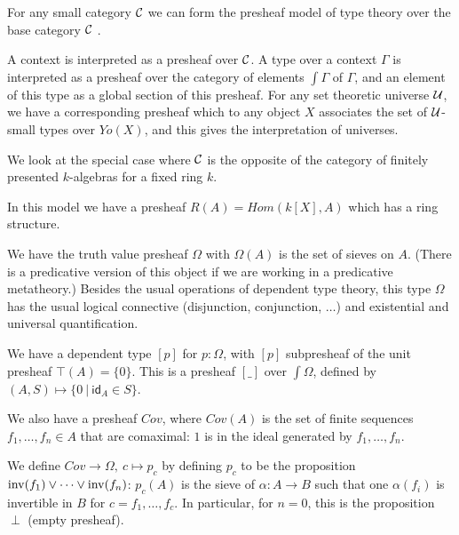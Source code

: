 For any small category $\mathcal{C}$ we can form the presheaf model of type theory over the base category $\mathcal{C}$ \cite{hofmann,huber-phd-thesis}
.

A context is interpreted as a presheaf over $\mathcal{C}$. A type over a context $\Gamma$ is interpreted as
a presheaf over the category of elements $\int\Gamma$ of $\Gamma$,
and an element of this type as a global section
of this presheaf. For any set theoretic universe $\mathcal{U}$, we have a corresponding presheaf which to
any object $X$ associates the set of $\mathcal{U}$-small types over $Yo(X)$, and this gives the interpretation
of universes. 

\medskip

We look at the special case where $\mathcal{C}$ is the opposite of the category of finitely presented $k$-algebras for a fixed
ring $k$.

    In this model we have a presheaf $R(A) = Hom(k[X],A)$ which has a ring structure.

    We have the truth value presheaf $\Omega$ with $\Omega(A)$ is the set of sieves on $A$.
    (There is a predicative version of this object if we are working in a predicative metatheory.)
    Besides the usual operations of dependent type theory, this type $\Omega$ has the usual logical connective (disjunction, conjunction,
    $\dots$) and existential and universal quantification.

    We have a dependent type $[p]$ for $p:\Omega$, with $[p]$ subpresheaf of the unit presheaf $\top(A) = \{0\}$. This is a presheaf $[\_]$
    over $\int\Omega$, defined by $(A,S)\mapsto \{0~|~\mathsf{id}_A\in S\}$.

    We also have a presheaf $Cov$, where $Cov(A)$ is the set of finite sequences $f_1,\dots,f_n\in A$ that are comaximal: $1$ is in the
    ideal generated by $f_1,\dots,f_n$.

    We define $Cov\rightarrow\Omega,~c\mapsto p_c$ by defining $p_c$ to be the proposition $\mathrm{inv}(f_1)\vee\dots\vee\mathrm{inv}(f_n)$: $p_c(A)$
    is the sieve of $\alpha:A\rightarrow B$ such that one $\alpha(f_i)$ is invertible in $B$
    for $c = f_1,\dots,f_c$. In particular, for $n=0$, this is the proposition $\perp$ (empty presheaf).

